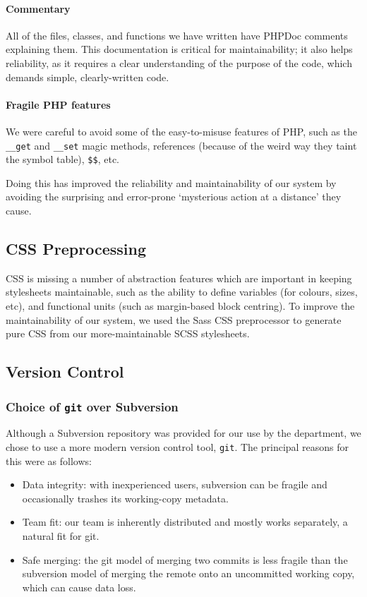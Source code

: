\paragraph{Commentary}
All of the files, classes, and functions we have written have PHPDoc
comments explaining them. This documentation is critical for
maintainability; it also helps reliability, as it requires a clear
understanding of the purpose of the code, which demands simple,
clearly-written code.

\paragraph{Fragile PHP features}
We were careful to avoid some of the easy-to-misuse features of PHP,
such as the \verb!__get! and \verb!__set! magic methods, references
(because of the weird way they taint the symbol table), \verb!$$!, etc.

Doing this has improved the reliability and maintainability of our
system by avoiding the surprising and error-prone `mysterious action
at a distance' they cause.

\subsection{CSS Preprocessing}

CSS is missing a number of abstraction features which are important in
keeping stylesheets maintainable, such as the ability to define
variables (for colours, sizes, etc), and functional units (such as
margin-based block centring). To improve the maintainability of our
system, we used the Sass CSS preprocessor to generate
pure CSS from our more-maintainable SCSS stylesheets.

\subsection{Version Control}

\subsubsection{Choice of \texttt{git} over Subversion}

Although a Subversion repository was provided for our use by the
department, we chose to use a more modern version control tool,
\texttt{git}. The principal reasons for this were as follows:

\begin{itemize}
\item Data integrity: with inexperienced users, subversion can be
  fragile and occasionally trashes its working-copy metadata.
\item Team fit: our team is inherently distributed and mostly works
  separately, a natural fit for git.
\item Safe merging: the git model of merging two commits is less
  fragile than the subversion model of merging the remote onto an
  uncommitted working copy, which can cause data loss.
\end{itemize}

